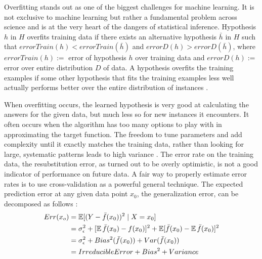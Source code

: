 Overﬁtting stands out as one of the biggest challenges for machine learning. It is not exclusive to machine learning but rather a fundamental problem across science and is at the very heart of the dangers of statistical inference. Hypothesis \(h\) in \(H\) overﬁts training data if there exists an alternative hypothesis \(\bar{h}\) in \(H\) such that \(errorTrain(h) < errorTrain(\bar{h})\) and \(errorD(h) > errorD(\bar{h})\), where \(errorTrain(h):=\) error of hypothesis \(h\) over training data and \(errorD(h):=\) error over entire distribution \(D\) of data. A hypothesis overfits the training examples if some other hypothesis that fits the training examples less well actually performs better over the entire distribution of instances \cite{yaser}.

When overfitting occurs, the learned hypothesis is very good at calculating the answers for the given data, but much less so for new instances it encounters. It often occurs when the algorithm has too many options to play with in approximating the target function. The freedom to tune parameters and add complexity until it exactly matches the training data, rather than looking for large, systematic patterns leads to high variance \cite{yaser}. The error rate on the training data, the resubstitution error, as turned out to be overly optimistic, is not a good indicator of performance on future data. A fair way to properly estimate error rates is to use cross-validation as a powerful general technique. The expected prediction error at any given data point \(x_0\), the generalization error, can be decomposed as follows \cite{ian}: 
\begin{align*}
Err(x_o) &= \operatorname{\mathbb{E}}[(Y - \bar{f}(x_0))^2 \mid X = x_0] \\
& =  \sigma^2_\epsilon + [\operatorname{\mathbb{E}}\bar{f}(x_0) - f(x_0)]^2 + \operatorname{\mathbb{E}}[\bar{f}(x_0) - \operatorname{\mathbb{E}}\bar{f}(x_0)]^2\\
& =  \sigma^2_\epsilon + Bias^2(\bar{f}(x_0)) + Var(\bar{f}(x_0)) \\
& = Irreducible Error + Bias^2 + Variance
\end{align*}

